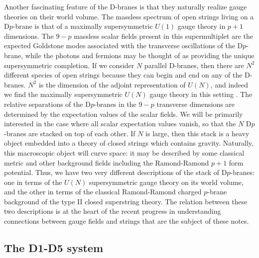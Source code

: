 \documentclass[12pt]{article}
\begin{document}
Another fascinating feature of the D-branes is that they naturally realize
gauge theories on their world volume. The massless spectrum of open strings
living on a D$p$-brane is that of a maximally supersymmetric $U(1)$
gauge theory in $p+1$ dimensions. The $9-p$ massless
scalar fields present in this supermultiplet are the expected Goldstone 
modes associated with the transverse oscillations of the D$p$-brane,
while the photons and fermions
may be thought of as providing the unique supersymmetric
completion.
If we consider $N$ parallel D-branes,
then there are $N^2$ different species of open strings because they can
begin and end on any of the D-branes. 
$N^2$ is the dimension of the adjoint representation of $U(N)$,
and indeed we find the maximally supersymmetric $U(N)$ 
gauge theory in this setting \cite{Witten}.
The relative separations of the D$p$-branes in the $9-p$ transverse
dimensions are determined by the expectation values of the scalar fields.
We will be primarily interested in the case where all scalar expectation
values vanish, so that the $N$ D$p$-branes are stacked on top of each other.
If $N$ is large, then this stack is a heavy object embedded into a theory
of closed strings which contains gravity. Naturally, this macroscopic
object will curve space: it may be described by some classical metric
and other background fields including the Ramond-Ramond 
$p+1$ form potential.
Thus, we have two very different descriptions of the stack of D$p$-branes:
one in terms of the $U(N)$ supersymmetric gauge theory on its world volume,
and the other in terms of the classical
Ramond-Ramond charged $p$-brane background of the type II
closed superstring theory. The relation between these two descriptions
is at the heart of the recent progress in understanding 
connections between gauge fields and strings that are the subject of
these notes.

\subsection{The D1-D5 system}
\end{document}
